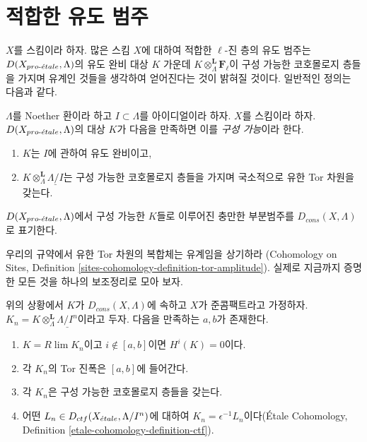 \section{적합한 유도 범주}
\label{section-suitable-derived}

\noindent
$X$를 스킴이라 하자. 많은 스킴 $X$에 대하여 적합한 $\ell$-진 층의
유도 범주는 $D(X_{pro\text{-}\acute{e}tale}, \Lambda)$의 유도 완비 대상 $K$ 가운데
$K \otimes_\Lambda^\mathbf{L} \mathbf{F}_\ell$이 구성 가능한
코호몰로지 층들을 가지며 유계인 것들을 생각하여 얻어진다는 것이
밝혀질 것이다. 일반적인 정의는 다음과 같다.

\begin{definition}
\label{definition-Dbc}
$\Lambda$를 Noether 환이라 하고 $I \subset \Lambda$를 아이디얼이라
하자. $X$를 스킴이라 하자. $D(X_{pro\text{-}\acute{e}tale}, \Lambda)$의 대상 $K$가
다음을 만족하면 이를 {\it 구성 가능}이라 한다.
\begin{enumerate}
\item $K$는 $I$에 관하여 유도 완비이고,
\item $K \otimes_\Lambda^\mathbf{L} \underline{\Lambda/I}$는 구성
가능한 코호몰로지 층들을 가지며 국소적으로 유한 Tor 차원을 갖는다.
\end{enumerate}
$D(X_{pro\text{-}\acute{e}tale}, \Lambda)$에서 구성 가능한 $K$들로 이루어진 충만한
부분범주를 $D_{cons}(X, \Lambda)$로 표기한다.
\end{definition}

\noindent
우리의 규약에서 유한 Tor 차원의 복합체는 유계임을 상기하라
(Cohomology on Sites, Definition
\ref{sites-cohomology-definition-tor-amplitude}). 실제로 지금까지
증명한 모든 것을 하나의 보조정리로 모아 보자.

\begin{lemma}
\label{lemma-describe-constructible-complexes}
위의 상황에서 $K$가 $D_{cons}(X, \Lambda)$에 속하고 $X$가
준콤팩트라고 가정하자.
$K_n = K \otimes_\Lambda^\mathbf{L} \underline{\Lambda/I^n}$이라고 두자.
다음을 만족하는 $a, b$가 존재한다.
\begin{enumerate}
\item $K = R\lim K_n$이고 $i \not \in [a, b]$이면 $H^i(K) = 0$이다.
\item 각 $K_n$의 Tor 진폭은 $[a, b]$에 들어간다.
\item 각 $K_n$은 구성 가능한 코호몰로지 층들을 갖는다.
\item 어떤 $L_n \in D_{ctf}(X_{\acute{e}tale}, \Lambda/I^n)$에 대하여
$K_n = \epsilon^{-1}L_n$이다(\'Etale Cohomology, Definition
\ref{etale-cohomology-definition-ctf}).
\end{enumerate}
\end{lemma}

